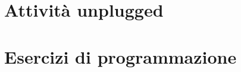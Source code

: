 \clm{}{}{}

\section{Attività unplugged}\label{unplugged}


\section{Esercizi di programmazione}\label{prog}